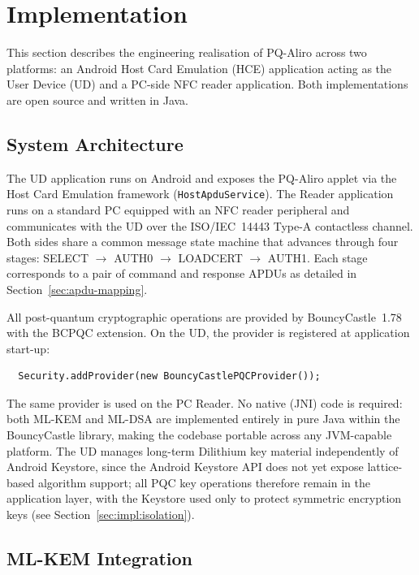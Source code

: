 \section{Implementation}
\label{sec:implementation}

This section describes the engineering realisation of PQ-Aliro across two
platforms: an Android Host Card Emulation (HCE) application acting as the User
Device (UD) and a PC-side NFC reader application.
Both implementations are open source and written in Java.

\subsection{System Architecture}
\label{sec:impl:arch}

The UD application runs on Android and exposes the PQ-Aliro applet via the
Host Card Emulation framework (\texttt{HostApduService}).
The Reader application runs on a standard PC equipped with an NFC reader
peripheral and communicates with the UD over the ISO/IEC~14443 Type-A
contactless channel.
Both sides share a common message state machine that advances through four
stages: SELECT $\to$ AUTH0 $\to$ LOADCERT $\to$ AUTH1\@.
Each stage corresponds to a pair of command and response APDUs as detailed in
Section~\ref{sec:apdu-mapping}.

All post-quantum cryptographic operations are provided by BouncyCastle~1.78
with the BCPQC extension.
On the UD, the provider is registered at application start-up:
\begin{verbatim}
  Security.addProvider(new BouncyCastlePQCProvider());
\end{verbatim}
The same provider is used on the PC Reader.
No native (JNI) code is required: both ML-KEM and ML-DSA are implemented
entirely in pure Java within the BouncyCastle library, making the codebase
portable across any JVM-capable platform.
The UD manages long-term Dilithium key material independently of Android
Keystore, since the Android Keystore API does not yet expose lattice-based
algorithm support; all PQC key operations therefore remain in the application
layer, with the Keystore used only to protect symmetric encryption keys (see
Section~\ref{sec:impl:isolation}).

\subsection{ML-KEM Integration}
\label{sec:impl:mlkem}

